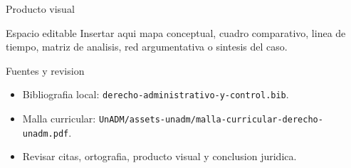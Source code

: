 \documentclass[
  spanish,
  aspectratio=169,
  xcolor={dvipsnames,table}
]{beamer}
\begin{document}
\begin{frame}{Producto visual}
  \begin{block}{Espacio editable}
    Insertar aqui mapa conceptual, cuadro comparativo, linea de tiempo,
    matriz de analisis, red argumentativa o sintesis del caso.
  \end{block}
  \centering
\end{frame}

\begin{frame}{Fuentes y revision}
  \begin{itemize}
    \item Bibliografia local: \texttt{derecho-administrativo-y-control.bib}.
    \item Malla curricular: \texttt{UnADM/assets-unadm/malla-curricular-derecho-unadm.pdf}.
    \item Revisar citas, ortografia, producto visual y conclusion juridica.
  \end{itemize}
\end{frame}
\end{document}
